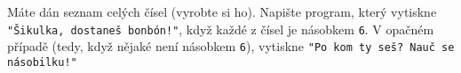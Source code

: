 \question[50]
Máte dán seznam celých čísel (vyrobte si ho). Napište program, který vytiskne
\texttt{"Šikulka, dostaneš bonbón!"}, když každé z čísel je násobkem \texttt{6}.
V opačném případě (tedy, když nějaké není násobkem \texttt{6}), vytiskne
\texttt{"Po kom ty seš? Nauč se násobilku!"}
